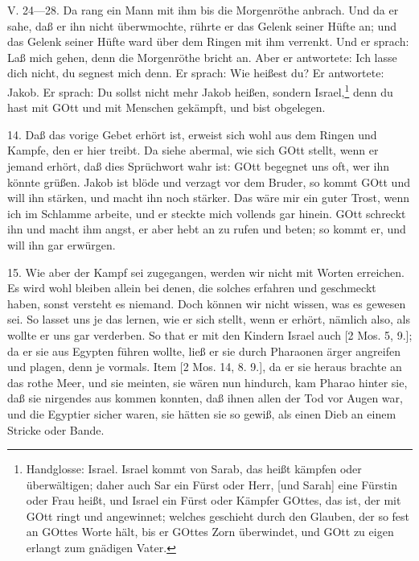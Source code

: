 \begin{schriftzitat}
V. 24—28. Da rang ein Mann mit ihm bis die Morgenröthe anbrach. Und da er sahe, daß er ihn nicht überwmochte, rührte er das Gelenk seiner Hüfte an; und das Gelenk seiner Hüfte ward über dem Ringen mit ihm verrenkt. Und er sprach: Laß mich gehen, denn die Morgenröthe bricht an. Aber er antwortete: Ich lasse dich nicht, du segnest mich denn. Er sprach: Wie heißest du? Er antwortete: Jakob. Er sprach: Du sollst nicht mehr Jakob heißen, sondern Israel,\footnote{Handglosse: Israel. Israel kommt von Sarab, das heißt kämpfen oder überwältigen; daher auch Sar ein Fürst oder Herr, [und Sarah] eine Fürstin oder Frau heißt, und Israel ein Fürst oder Kämpfer GOttes, das ist, der mit GOtt ringt und angewinnet; welches geschieht durch den Glauben, der so fest an GOttes Worte hält, bis er GOttes Zorn überwindet, und GOtt zu eigen erlangt zum gnädigen Vater.} denn du hast mit GOtt und mit Menschen gekämpft, und bist obgelegen.
\end{schriftzitat}

14. Daß das vorige Gebet erhört ist, erweist sich wohl aus dem Ringen und Kampfe, den er hier treibt. Da siehe abermal, wie sich GOtt stellt, wenn er jemand erhört, daß dies Sprüchwort wahr ist: GOtt begegnet uns oft, wer ihn könnte grüßen. Jakob ist blöde und verzagt vor dem Bruder, so kommt GOtt und will ihn stärken, und macht ihn noch stärker. Das wäre mir ein guter Trost, wenn ich im Schlamme arbeite, und er steckte mich vollends gar hinein. GOtt schreckt ihn und macht ihm angst, er aber hebt an zu rufen und beten; so kommt er, und will ihn gar erwürgen.

15. Wie aber der Kampf sei zugegangen, werden wir nicht mit Worten erreichen. Es wird wohl bleiben allein bei denen, die solches erfahren und geschmeckt haben, sonst versteht es niemand. Doch können wir nicht wissen, was es gewesen sei. So lasset uns je das lernen, wie er sich stellt, wenn er erhört, nämlich also, als wollte er uns gar verderben. So that er mit den Kindern Israel auch [2 Mos. 5, 9.]; da er sie aus Egypten führen wollte, ließ er sie durch Pharaonen ärger angreifen und plagen, denn je vormals. Item [2 Mos. 14, 8. 9.], da er sie heraus brachte an das rothe Meer, und sie meinten, sie wären nun hindurch, kam Pharao hinter sie, daß sie nirgendes aus kommen konnten, daß ihnen allen der Tod vor Augen war, und die Egyptier sicher waren, sie hätten sie so gewiß, als einen Dieb an einem Stricke oder Bande.

